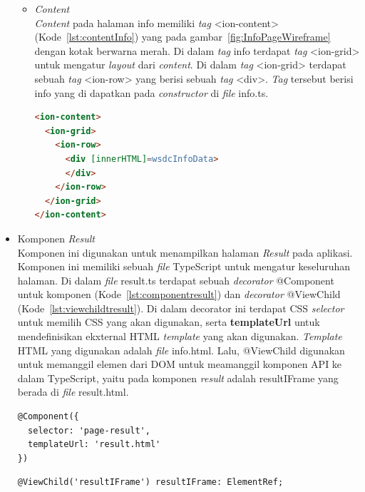 \begin{itemize}
\begin{itemize}
		\item \textit{Content} \\
		\textit{Content} pada halaman info memiliki \textit{tag} <ion-content> (Kode~\ref{lst:contentInfo}) yang pada gambar~\ref{fig:InfoPageWireframe} dengan kotak berwarna merah. Di dalam \textit{tag} info terdapat \textit{tag} <ion-grid> untuk mengatur \textit{layout} dari \textit{content}. Di dalam \textit{tag} <ion-grid> terdapat sebuah \textit{tag} <ion-row> yang berisi sebuah \textit{tag} <div>. \textit{Tag} tersebut berisi info yang di dapatkan pada \textit{constructor} di \textit{file} info.ts.

\begin{lstlisting}[language=html, label={lst:contentInfo}, caption=\textit{Content} pada info.html]
<ion-content>
  <ion-grid>
    <ion-row>
      <div [innerHTML]=wsdcInfoData>
      </div>
    </ion-row>
  </ion-grid>
</ion-content>
\end{lstlisting} 
	\end{itemize}

\newpage

	\item Komponen \textit{Result} \\
	Komponen ini digunakan untuk menampilkan halaman \textit{Result} pada aplikasi. Komponen ini memiliki sebuah \textit{file} TypeScript untuk mengatur keseluruhan halaman. Di dalam \textit{file} result.ts terdapat sebuah \textit{decorator} @Component untuk komponen (Kode~\ref{lst:componentresult}) dan \textit{decorator} @ViewChild (Kode~\ref{lst:viewchildtresult}). Di dalam decorator ini terdapat CSS \textit{selector} untuk memilih CSS yang akan digunakan, serta \textbf{templateUrl} untuk mendefinisikan ekxternal HTML \textit{template} yang akan digunakan. \textit{Template} HTML yang digunakan adalah \textit{file} info.html. Lalu, @ViewChild digunakan untuk memanggil elemen dari DOM untuk meamanggil komponen API ke dalam TypeScript, yaitu pada komponen \textit{result} adalah resultIFrame yang berada di \textit{file} result.html.
	
\begin{lstlisting}[language=html, label={lst:componentresult}, caption=@Component pada result.ts]
@Component({
  selector: 'page-result',
  templateUrl: 'result.html'
})
\end{lstlisting} 

\begin{lstlisting}[language=html, label={lst:viewchildtresult}, caption=@ViewChild pada result.ts]
@ViewChild('resultIFrame') resultIFrame: ElementRef;
\end{lstlisting} 


\end{itemize}
